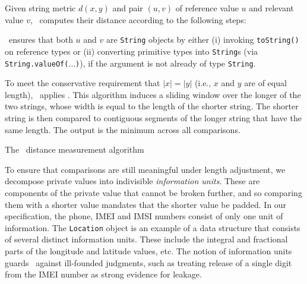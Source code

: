 Given string metric $d(x,y)$ and pair $(u,v)$ of reference value $u$ and relevant value $v$, \Tool\ computes their distance according to the following steps:
\begin{compactenum}
	\item \Tool\ ensures that both $u$ and $v$ are {\tt String} objects by either (i) invoking {\tt toString()} on reference types or (ii) converting primitive types into {\tt String}s
	(via {\tt String.valueOf($\ldots$)}), if
	the argument is not already of type {\tt String}.
	\item To meet the conservative requirement that $|x|=|y|$ (i.e., $x$ and $y$ are of equal length), \Tool\ applies . This algorithm induces a sliding window over the longer of the two strings, whose width is equal to the length of the shorter string. The shorter string is then compared to contiguous segments of the longer string that have the same length. The output is the minimum across all comparisons.
\end{compactenum}


\begin{algorithm}[t]
\begin{small}
\DontPrintSemicolon
{}
\BlankLine
{}
\end{small}
\caption{\label{Al:normalized}The \Tool\ distance measurement algorithm}
\end{algorithm}

To ensure that comparisons are still meaningful under length adjustment, we decompose private values into indivisible \emph{information units}. These are components of the private value that cannot be broken further, and so comparing them with a shorter value mandates that the shorter value be padded. In our specification, the phone, IMEI and IMSI numbers consist of only one unit of information.
%
The {\tt Location} object is an example of a data structure that consists of several distinct information units. These include the integral and fractional parts of the longitude and latitude values, etc. 
%
The notion of information units guards \Tool\ against ill-founded judgments, such as treating release of a single digit from the IMEI number as strong evidence for leakage.

